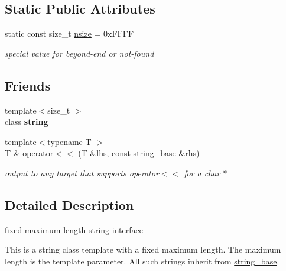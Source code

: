 \subsection*{Static Public Attributes}
\begin{DoxyCompactItemize}
\item 
\mbox{\label{classhwlib_1_1string__base_aaf7b2cb8dc0034ff17533227d804d320}} 
static const size\+\_\+t \hyperlink{classhwlib_1_1string__base_aaf7b2cb8dc0034ff17533227d804d320}{nsize} = 0x\+F\+F\+FF
\begin{DoxyCompactList}\small\item\em special value for beyond-\/end or not-\/found \end{DoxyCompactList}\end{DoxyCompactItemize}
\subsection*{Friends}
\begin{DoxyCompactItemize}
\item 
\mbox{\label{classhwlib_1_1string__base_aaecd502d6cdb0a573da01975d30ff100}} 
{\footnotesize template$<$size\+\_\+t $>$ }\\class {\bfseries string}
\item 
\mbox{\label{classhwlib_1_1string__base_a9b3db5ffaefd2dfa37e5c72622c61a4f}} 
{\footnotesize template$<$typename T $>$ }\\T \& \hyperlink{classhwlib_1_1string__base_a9b3db5ffaefd2dfa37e5c72622c61a4f}{operator$<$$<$} (T \&lhs, const \hyperlink{classhwlib_1_1string__base}{string\+\_\+base} \&rhs)
\begin{DoxyCompactList}\small\item\em output to any target that supports operator$<$$<$ for a char $\ast$ \end{DoxyCompactList}\end{DoxyCompactItemize}


\subsection{Detailed Description}
fixed-\/maximum-\/length string interface

This is a string class template with a fixed maximum length. The maximum length is the template parameter. All such strings inherit from \hyperlink{classhwlib_1_1string__base}{string\+\_\+base}.

